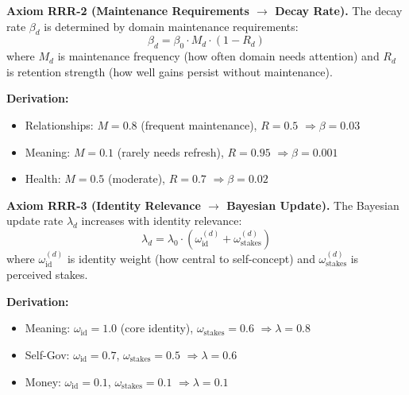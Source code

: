 \begin{tcolorbox}[colback=red!5!white, colframe=red!75!black, title=Axiom RRR-2: Maintenance Requirements]
\textbf{Axiom RRR-2 (Maintenance Requirements $\rightarrow$ Decay Rate).}
The decay rate $\beta_d$ is determined by domain maintenance requirements:
\begin{equation}
\beta_d = \beta_0 \cdot M_d \cdot (1 - R_d)
\end{equation}
where $M_d$ is maintenance frequency (how often domain needs attention)
and $R_d$ is retention strength (how well gains persist without maintenance).

\textbf{Derivation:}
\begin{itemize}[nosep]
\item Relationships: $M = 0.8$ (frequent maintenance), $R = 0.5$ $\Rightarrow \beta = 0.03$
\item Meaning: $M = 0.1$ (rarely needs refresh), $R = 0.95$ $\Rightarrow \beta = 0.001$
\item Health: $M = 0.5$ (moderate), $R = 0.7$ $\Rightarrow \beta = 0.02$
\end{itemize}
\end{tcolorbox}

\begin{tcolorbox}[colback=red!5!white, colframe=red!75!black, title=Axiom RRR-3: Identity Relevance]
\textbf{Axiom RRR-3 (Identity Relevance $\rightarrow$ Bayesian Update).}
The Bayesian update rate $\lambda_d$ increases with identity relevance:
\begin{equation}
\lambda_d = \lambda_0 \cdot \left( \omega_{\text{id}}^{(d)} + \omega_{\text{stakes}}^{(d)} \right)
\end{equation}
where $\omega_{\text{id}}^{(d)}$ is identity weight (how central to self-concept)
and $\omega_{\text{stakes}}^{(d)}$ is perceived stakes.

\textbf{Derivation:}
\begin{itemize}[nosep]
\item Meaning: $\omega_{\text{id}} = 1.0$ (core identity), $\omega_{\text{stakes}} = 0.6$ $\Rightarrow \lambda = 0.8$
\item Self-Gov: $\omega_{\text{id}} = 0.7$, $\omega_{\text{stakes}} = 0.5$ $\Rightarrow \lambda = 0.6$
\item Money: $\omega_{\text{id}} = 0.1$, $\omega_{\text{stakes}} = 0.1$ $\Rightarrow \lambda = 0.1$
\end{itemize}
\end{tcolorbox}

